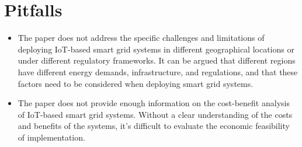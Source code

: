 \documentclass{article}
\begin{document}
\section{Pitfalls}

\begin{itemize}

\item The paper does not address the specific challenges and limitations of deploying IoT-based smart grid systems in different geographical locations or under different regulatory frameworks. It can be argued that different regions have different energy demands, infrastructure, and regulations, and that these factors need to be considered when deploying smart grid systems.

\item The paper does not provide enough information on the cost-benefit analysis of IoT-based smart grid systems. Without a clear understanding of the costs and benefits of the systems, it's difficult to evaluate the economic feasibility of implementation.

\end{itemize}
\end{document}
